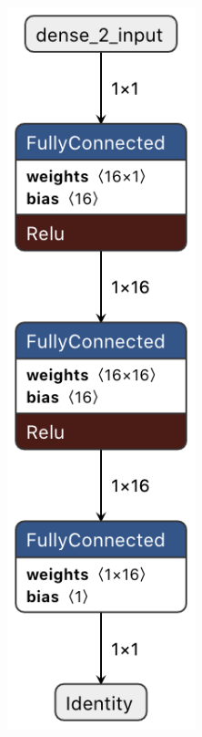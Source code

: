 \documentclass[oneside]{tum-book}
\begin{document}
\begin{figure}[h]
     \centering
     \begin{subfigure}[b]{0.3\textwidth}
         \centering
         \includegraphics[width=0.6\textwidth]{figures/hello_world_graph.png}

\end{subfigure}
\end{figure}
\end{document}
